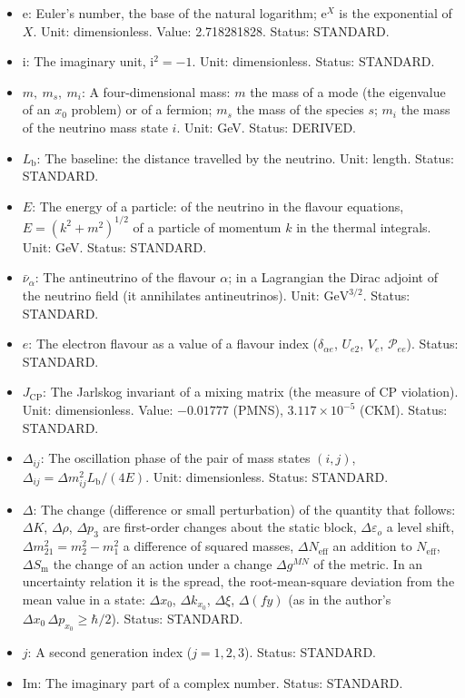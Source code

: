 \documentclass[
  10pt,
]{article}
\begin{document}
\begin{itemize}
\item
  \(\mathrm{e}\): Euler's number, the base of the natural logarithm;
  \(\mathrm{e}^{X}\) is the exponential of \(X\). Unit: dimensionless.
  Value: 2.718281828. Status: STANDARD.
\item
  \(\mathrm{i}\): The imaginary unit, \(\mathrm{i}^2 = -1\). Unit:
  dimensionless. Status: STANDARD.
\item
  \(m,\ m_s,\ m_i\): A four-dimensional mass: \(m\) the mass of a mode
  (the eigenvalue of an \(x_0\) problem) or of a fermion; \(m_s\) the
  mass of the species \(s\); \(m_i\) the mass of the neutrino mass state
  \(i\). Unit: GeV. Status: DERIVED.
\item
  \(L_{\mathrm{b}}\): The baseline: the distance travelled by the
  neutrino. Unit: length. Status: STANDARD.
\item
  \(E\): The energy of a particle: of the neutrino in the flavour
  equations, \(E = (k^2 + m^2)^{1/2}\) of a particle of momentum \(k\)
  in the thermal integrals. Unit: GeV. Status: STANDARD.
\item
  \(\bar\nu_\alpha\): The antineutrino of the flavour \(\alpha\); in a
  Lagrangian the Dirac adjoint of the neutrino field (it annihilates
  antineutrinos). Unit: \(\mathrm{GeV}^{3/2}\). Status: STANDARD.
\item
  \(e\): The electron flavour as a value of a flavour index
  (\(\delta_{\alpha e}\), \(U_{e2}\), \(V_e\), \(\mathcal{P}_{ee}\)).
  Status: STANDARD.
\item
  \(J_{\mathrm{CP}}\): The Jarlskog invariant of a mixing matrix (the
  measure of CP violation). Unit: dimensionless. Value: \(-0.01777\)
  (PMNS), \(3.117\times10^{-5}\) (CKM). Status: STANDARD.
\item
  \(\Delta_{ij}\): The oscillation phase of the pair of mass states
  \((i, j)\), \(\Delta_{ij} = \Delta m_{ij}^2L_{\mathrm{b}}/(4E)\).
  Unit: dimensionless. Status: STANDARD.
\item
  \(\Delta\): The change (difference or small perturbation) of the
  quantity that follows: \(\Delta K\), \(\Delta\rho\), \(\Delta p_3\)
  are first-order changes about the static block,
  \(\Delta\varepsilon_o\) a level shift,
  \(\Delta m^2_{21} = m_2^2 - m_1^2\) a difference of squared masses,
  \(\Delta N_{\mathrm{eff}}\) an addition to \(N_{\mathrm{eff}}\),
  \(\Delta S_{\mathrm{m}}\) the change of an action under a change
  \(\Delta g^{MN}\) of the metric. In an uncertainty relation it is the
  spread, the root-mean-square deviation from the mean value in a state:
  \(\Delta x_0\), \(\Delta k_{x_0}\), \(\Delta\xi\), \(\Delta(fy)\) (as
  in the author's \(\Delta x_0\,\Delta p_{x_0} \ge \hbar/2\)). Status:
  STANDARD.
\item
  \(j\): A second generation index (\(j = 1, 2, 3\)). Status: STANDARD.
\item
  \(\mathrm{Im}\): The imaginary part of a complex number. Status:
  STANDARD.
\end{itemize}
\end{document}
